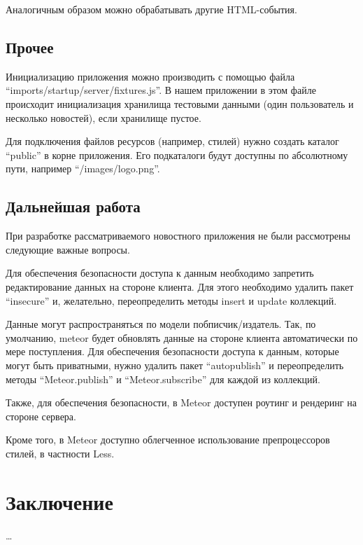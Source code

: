 \documentclass[a4paper,12pt]{article}
\begin{document}
Аналогичным образом можно обрабатывать другие HTML-события.

\subsection{Прочее}
Инициализацию приложения можно производить с помощью файла
``imports/startup/server/fixtures.js''. В нашем приложении
в этом файле происходит инициализация хранилища тестовыми данными
(один пользователь и несколько новостей), если хранилище
пустое.

Для подключения файлов ресурсов (например, стилей) нужно
создать каталог ``public'' в корне приложения. Его
подкаталоги будут доступны по абсолютному пути,
например ``/images/logo.png''.

\subsection{Дальнейшая работа}
При разработке рассматриваемого новостного приложения не были
рассмотрены следующие важные вопросы.

Для обеспечения безопасности доступа к данным необходимо
запретить редактирование данных на стороне клиента.
Для этого необходимо удалить пакет ``insecure''
и, желательно, переопределить методы insert и update
коллекций.

Данные могут распространяться по модели побписчик/издатель.
Так, по умолчанию, meteor будет обновлять данные
на стороне клиента автоматически по мере поступления.
Для обеспечения безопасности доступа к данным, 
которые могут быть приватными, нужно удалить пакет 
``autopublish'' и переопределить методы
``Meteor.publish'' и ``Meteor.subscribe'' для
каждой из коллекций.

Также, для обеспечения безопасности,
в Meteor доступен роутинг и рендеринг 
на стороне сервера.

Кроме того, в Meteor доступно облегченное использование препроцессоров стилей,
в частности Less.

\section*{Заключение}
\dots

\begin{thebibliography}{99}
	
\end{thebibliography}
\end{document}
